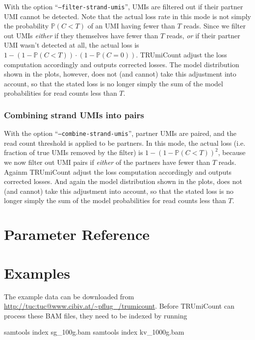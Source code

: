 \documentclass[10pt]{article}
\begin{document}
With the option ``\texttt{--filter-strand-umis}'', UMIs are filtered out if their partner UMI cannot be detected. Note that the actual loss rate in this mode is not simply the probability $\mathbb{P}(C < T)$ of an UMI having fewer than $T$ reads. Since we filter out UMIs \emph{either} if they themselves have fewer than $T$ reads, \emph{or} if their partner UMI wasn't detected at all, the actual loss is $1 - (1 - \mathbb{P}(C < T))\cdot (1 - \mathbb{P}(C=0))$. TRUmiCount adjust the loss computation accordingly and outputs corrected losses. The model distribution shown in the plots, however, does not (and cannot) take this adjustment into account, so that the stated loss is no longer simply the sum of the model probabilities for read counts less than $T$.

\subsubsection*{Combining strand UMIs into pairs}

With the option ``\texttt{--combine-strand-umis}'', partner UMIs are paired, and the read count threshold is applied to be partners. In this mode, the actual loss (i.e. fraction of true UMIs removed by the filter) is $1 - (1-\mathbb{P}(C < T))^2$, because we now filter out UMI pairs if \emph{either} of the partners have fewer than $T$ reads. Againm TRUmiCount adjust the loss computation accordingly and outputs corrected losses. And again the model distribution shown in the plots, does not (and cannot) take this adjustment into account, so that the stated loss is no longer simply the sum of the model probabilities for read counts less than $T$.

\section{Parameter Reference}

\begin{description}

\end{description}

\section{Examples}

The example data can be downloaded from \url{http://tuc:tuc@www.cibiv.at/~pflug_/trumicount}. Before TRUmiCount can process these BAM files, they need to be indexed by running

\begin{shellcode}
samtools index sg_100g.bam
samtools index kv_1000g.bam
\end{shellcode}
\end{document}
